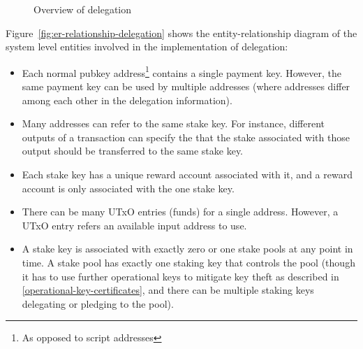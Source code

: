 \documentclass[11pt,a4paper,dvipsnames,twosided]{article}
\begin{document}
\begin{figure}[ht]
  \caption{Overview of delegation}
  \label{fig:overview-delegation}
\end{figure}

Figure~\ref{fig:er-relationship-delegation} shows the entity-relationship
diagram of the system level entities involved in the implementation of
delegation:
\begin{itemize}
\item Each normal pubkey address\footnote{As opposed to script addresses}
  contains a single payment key. However, the same payment key
  can be used by multiple addresses (where addresses differ among each other in
  the delegation information).
\item Many addresses can refer to the same stake key. For instance, different
  outputs of a transaction can specify the that the stake associated with those
  output should be transferred to the same stake key.
\item Each stake key has a unique reward account associated with it, and a
  reward account is only associated with the one stake key.
\item There can be many UTxO entries (funds) for a single address. However, a
  UTxO entry refers an available input address to use.
\item A stake key is associated with exactly zero or one stake pools at any
  point in time. A stake pool has exactly one staking key that controls the pool
  (though it has to use further operational keys to mitigate key theft as described
  in \cref{operational-key-certificates}, and there can
  be multiple staking keys delegating or pledging to the pool).
\end{itemize}
\end{document}

